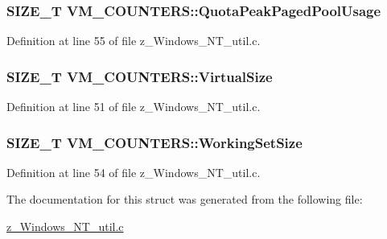 \hypertarget{structVM__COUNTERS_a2bfa57675a50a5d3207f0f2b178ac16b}{
\subsubsection[{Quota\-Peak\-Paged\-Pool\-Usage}]{\setlength{\rightskip}{0pt plus 5cm}S\-I\-Z\-E\-\_\-\-T V\-M\-\_\-\-C\-O\-U\-N\-T\-E\-R\-S\-::\-Quota\-Peak\-Paged\-Pool\-Usage}}\label{structVM__COUNTERS_a2bfa57675a50a5d3207f0f2b178ac16b}


Definition at line 55 of file z\-\_\-\-Windows\-\_\-\-N\-T\-\_\-util.\-c.

\hypertarget{structVM__COUNTERS_ab394da4c4d9b606a2ad4c00892a6917f}{
\subsubsection[{Virtual\-Size}]{\setlength{\rightskip}{0pt plus 5cm}S\-I\-Z\-E\-\_\-\-T V\-M\-\_\-\-C\-O\-U\-N\-T\-E\-R\-S\-::\-Virtual\-Size}}\label{structVM__COUNTERS_ab394da4c4d9b606a2ad4c00892a6917f}


Definition at line 51 of file z\-\_\-\-Windows\-\_\-\-N\-T\-\_\-util.\-c.

\hypertarget{structVM__COUNTERS_a8fff1cd61413ea383c0a9471ff59d033}{
\subsubsection[{Working\-Set\-Size}]{\setlength{\rightskip}{0pt plus 5cm}S\-I\-Z\-E\-\_\-\-T V\-M\-\_\-\-C\-O\-U\-N\-T\-E\-R\-S\-::\-Working\-Set\-Size}}\label{structVM__COUNTERS_a8fff1cd61413ea383c0a9471ff59d033}


Definition at line 54 of file z\-\_\-\-Windows\-\_\-\-N\-T\-\_\-util.\-c.



The documentation for this struct was generated from the following file\-:\begin{DoxyCompactItemize}
\item 
\hyperlink{z__Windows__NT__util_8c}{z\-\_\-\-Windows\-\_\-\-N\-T\-\_\-util.\-c}\end{DoxyCompactItemize}
